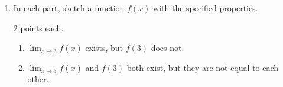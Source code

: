 \documentclass{article}
\begin{document}
\begin{enumerate}
\begin{enumerate}
  \item
    \begin{problem}[\vfill\newpage]
      $\displaystyle \lim_{x \to 1} [g(x)]^2$
    \end{problem}

    \begin{solution}
      We'll evaluate each one-sided limit as usual:  
      \begin{align*}
        \lim_{x \to 1^-} \Big[ g(x) \Big]^2 &= (-1)^2 \\
        \lim_{x \to 1^+} \Big[ g(x) \Big]^2 &= 1^2
      \end{align*}  
      and both these one-sided limits are equal, to $\boxed{1}$.
    \end{solution}

  \end{enumerate}

\item  \label{limits-sketch-discontinuities}

  In each part, sketch a function $f(x)$ with the specified properties.

  \begin{grading} 
    2 points each.
  \end{grading} 

  \begin{enumerate}
  \item
    \begin{problem}[\vfill]
      $\displaystyle \lim_{x \to 3} f(x)$ exists, but $f(3)$ does not.
    \end{problem}

    \begin{solution}
      \begin{center}
      \end{center}
    \end{solution}

  \item 
    \begin{problem}[\vfill]
      $\displaystyle \lim_{x \to 3} f(x)$ and $f(3)$ both exist, but they are not equal to each other.
    \end{problem}


\end{enumerate}
\end{enumerate}
\end{document}
